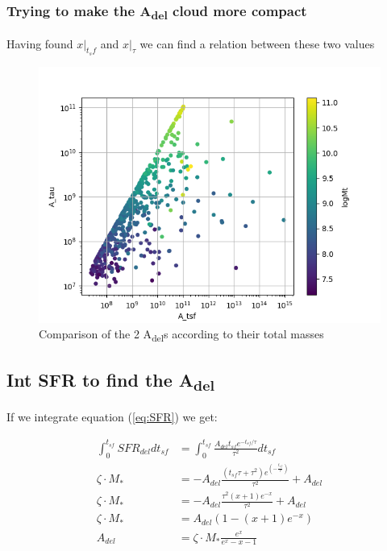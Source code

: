 \documentclass[a4paper,twocolumn]{article}
\begin{document}
\subsubsection{Trying to make the A\textsubscript{del} cloud more compact}
\label{sec:orge02c923}

Having found \(x|_{t_sf}\) and \(x|_{\tau}\) we can find a relation between these two values

\begin{figure}[!htpb]
\centering
\includegraphics[width=.9\linewidth]{./figs/A_tau-A_tsf_Mt.png}
\caption{\label{fig:Comparison of the 2 A_{del}s according to their total masses}Comparison of the 2 A\textsubscript{del}s according to their total masses}
\end{figure}


\subsection{Int SFR to find the A\textsubscript{del}}
\label{sec:org2f66940}

If we integrate equation (\ref{eq:SFR}) we get:


\begin{equation}\label{eq:int SFR}
\begin{align}
\int^{t_{sf}}_0 SFR_{del} dt_{sf}&=\int^{t_{sf}}_0 \frac{A_{del}t_{sf}e^{-t_{sf}/\tau}}{\tau^2} dt_{sf}\\
\zeta\cdot M_*&=-A_{del} \frac{{\left(t_{\mathit{sf}} \tau + \tau^{2}\right)} e^{\left(-\frac{t_{\mathit{sf}}}{\tau}\right)}}{\tau^{2}}+A_{del}\\
\zeta\cdot M_*&=-A_{del}\frac{\tau^2(x+1)e^{-x}}{\tau^2}+A_{del}\\
\zeta\cdot M_*& = A_{del}(1-(x+1)e^{-x})\\
A_{del}&=\zeta\cdot M_*\frac{e^x}{e^x-x-1}
\end{align}
\end{equation}
\end{document}

